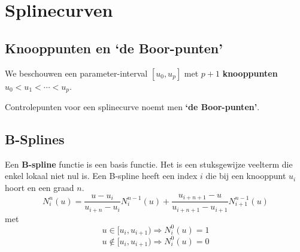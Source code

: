 \documentclass[computergesteund_ontwerp_van_curven_en_oppervlakken.tex]{subfiles}
\begin{document}
\chapter{Splinecurven}

\section{Knooppunten en `de Boor-punten'}
\begin{de}
\label{knooppunten}
We beschouwen een parameter-interval $[u_0,u_p]$ met $p+1$ \textbf{knooppunten} $u_0<u_1<\cdots<u_p$.
\end{de}
\begin{de}
\label{deboorpunten}
Controlepunten voor een splinecurve noemt men \textbf{`de Boor-punten'}.
\end{de}
\section{B-Splines}
\begin{de}
\label{bspline}
Een \textbf{B-spline} functie is een basis functie. Het is een stuksgewijze veelterm die enkel lokaal niet nul is. Een B-spline heeft een index $i$ die bij een knooppunt $u_i$ hoort en een graad $n$.
\[
N_{i}^{n}(u)
= \frac{u-u_i}{u_{i+n}-u_i}					N_{i}^{n-1}(u)
+ \frac{u_{i+n+1}-u}{u_{i+n+1}-u_{i+1}}		N_{i+1}^{n-1}(u)
\]
met
\[
u \in [u_i,u_{i+1}) \Rightarrow N_{i}^{0}(u) = 1
\]
\[
u \not\in [u_i,u_{i+1}) \Rightarrow N_{i}^{0}(u) = 0
\]
\end{de}
\end{document}
